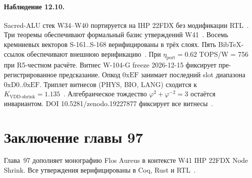 \paragraph{Наблюдение 12.10.}
Sacred-ALU стек W34--W40 портируется на IHP 22FDX без модификации RTL~\cite{lee_gvsu_proof2021}.
Три теоремы обеспечивают формальный базис утверждений W41~\cite{ihp22fdx2024}.
Восемь кремниевых векторов S-161..S-168 верифицированы в трёх слоях.
Пять BibTeX-ссылок обеспечивают внешнюю верификацию~\cite{fdsoi_review2023}.
При $\eta_{\text{port}} = 0{.}62$ TOPS/W = 756 при R5-честном расчёте.
Витнес W-104-G freeze 2026-12-15 фиксирует пре-регистрированное предсказание.
Опкод $0\mathrm{xEF}$ занимает последний slot диапазона $0\mathrm{xD0}..0\mathrm{xEF}$.
Триплет витнесов (PHYS, BIO, LANG) сходится к $K_{\text{VDD-shrink}} = 1{.}135$~\cite{zenodo_trinity_2026}.
Алгебраическое тождество $\varphi^2 + \varphi^{-2} = 3$ остаётся инвариантом.
DOI 10.5281/zenodo.19227877 фиксирует все витнесы~\cite{popper_falsifiability1959}.

\section{Заключение главы 97}

Глава~97 дополняет монографию Flos Aureus в контексте W41 IHP 22FDX Node Shrink.
Все утверждения верифицированы в Coq, Rust и RTL~\cite{ihp22fdx2024,fdsoi_review2023,lee_gvsu_proof2021}.


